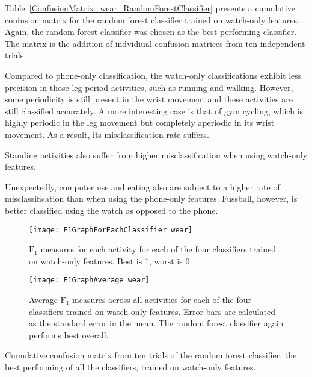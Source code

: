     Table~\ref{ConfusionMatrix_wear_RandomForestClassifier} presents a cumulative confusion matrix for the random forest classifier trained on watch-only features. Again, the random forest classifier was chosen as the best performing classifier. The matrix is the addition of indvidiual confusion matrices from ten independent trials.
    
    Compared to phone-only classification, the watch-only classifications exhibit less precision in those leg-period activities, such as running and walking. However, some periodicity is still present in the wrist movement and these activities are still classified accurately. A more interesting case is that of gym cycling, which is highly periodic in the leg movement but completely aperiodic in its wrist movement. As a result, its misclassification rate suffers.
    
    Standing activities also suffer from higher misclassification when using watch-only features.
    
    Unexpectedly, computer use and eating also are subject to a higher rate of misclassification than when using the phone-only features. Fussball, however, is better classified using the watch as opposed to the phone.

    \begin{figure}
      \centering
      \texttt{[image: F1GraphForEachClassifier\_wear]}
      \caption{$\mathrm{F}_1$ measures for each activity for each of the four classifiers trained on watch-only features. Best is 1, worst is 0.}
      \label{fig:F1GraphForEachClassifier_wear}
    \end{figure}

    \begin{figure}
      \centering
      \texttt{[image: F1GraphAverage\_wear]}
      \caption[Average $\mathrm{F}_1$ measures across all activities for each of the four classifiers trained on watch-only features]{Average $\mathrm{F}_1$ measures across all activities for each of the four classifiers trained on watch-only features. Error bars are calculated as the standard error in the mean. The random forest classifier again performs best overall.}
      \label{fig:F1GraphAverage_wear}
    \end{figure}
    
    \begin{table}
      \tabcolsep=0.11cm
      \centering
        
      \caption[Confusion matrix of the random forest classifier trained on watch-only features]{Cumulative confusion matrix from ten trials of the random forest classifier, the best performing of all the classifiers, trained on watch-only features.}
      \label{tab:ConfusionMatrix_wear_RandomForestClassifier}
    \end{table}
    
